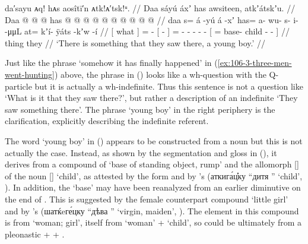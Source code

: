 \ex\label{ex:106-6-what-they-saw}%
%
\begingl
	\glpreamble	da′sayu ᴀq! hᴀs aosîtī′n ᴀtk!ᴀ′tsk!ᵘ. //
	\glpreamble	Daa sáyú áxʼ has awsiteen, atkʼátskʼu. //
	\gla	{} Daa {}  @ {} @ {}
			{}  @ {} {} has @  @ {} @ {} @ {} @ {} @ {} 
			{}  @ {} @ {} @ {} @ {} {} //
	\glb	{} daa {} s= á -yú
			{} á -xʼ {} has= a- wu- s- i-  -μμL
			{} at= kʼí- ÿáts -kʼw -í {} //
	\glc	{}[ what {}] =  -
			{}[  - {}] = - - - -  -
			{}[ =  base- child - - {}] //
	\gld	{} thing {} {}  {} 
			{}  {} {} they  {} {} {} {} {}
			{}  {} {} {} {} {}  //
	\glft	‘There is something that they saw there, a young boy.’
		//
\endgl
\xe

Just like the phrase  ‘somehow it has finally happened’ in (\ref{ex:106-3-three-men-went-hunting}) above, the phrase  in (\lastx) looks like a wh-question with the Q-particle  but it is actually a wh-indefinite.
Thus this sentence is not a question like ‘What is it that they saw there?’, but rather a description of an indefinite ‘They saw something there’.
The phrase  ‘young boy’ in the right periphery is the clarification, explicitly describing the indefinite referent.

The word  ‘young boy’ in (\lastx) appears to be constructed from a noun  but this is not actually the case.
Instead, as shown by the segmentation and gloss in (\lastx), it derives from a compound of  ‘base of standing object, rump’ \parencite[f04/116]{leer:1973} and the allomorph  [] of the noun  [] ‘child’, as attested by the form  \parencite[03/144]{leer:1973} and by \citeauthor{veniaminov:1846}’s  (аткига́ц҆̕ку  “дитя ” ‘child’, \cite[49]{veniaminov:1846}).
In addition, the  ‘base’ may have been reanalyzed from an earlier diminutive  on the end of .
This is suggested by the female counterpart compound  ‘little girl’ \parencite[03/144]{leer:1973} and by \citeauthor{veniaminov:1846}’s  (шатќeге́цку  “дѣва ” ‘virgin, maiden’, \cite[50]{veniaminov:1846}).
The  element in this compound is from  ‘woman; girl’, itself from  ‘woman’ +  ‘child’, so  could be ultimately from a pleonastic  +  + .

